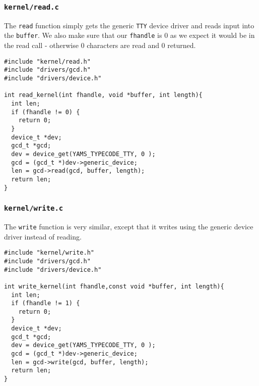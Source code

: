 \documentclass[a4paper,12pt]{article}
\begin{document}
\subsubsection{\texttt{kernel/read.c}}
The \texttt{read} function simply gets the generic \texttt{TTY} device driver and reads input into the \texttt{buffer}. We also make sure that our \texttt{fhandle} is 0 as we expect it would be in the read call - otherwise 0 characters are read and 0 returned.

\begin{lstlisting}
#include "kernel/read.h"
#include "drivers/gcd.h"
#include "drivers/device.h"

int read_kernel(int fhandle, void *buffer, int length){
  int len;
  if (fhandle != 0) {
    return 0;
  }
  device_t *dev;
  gcd_t *gcd;
  dev = device_get(YAMS_TYPECODE_TTY, 0 );
  gcd = (gcd_t *)dev->generic_device;
  len = gcd->read(gcd, buffer, length);
  return len;
}
\end{lstlisting}

\subsubsection{\texttt{kernel/write.c} }
The \texttt{write} function is very similar, except that it writes using the generic device driver instead of reading.

\begin{lstlisting}
#include "kernel/write.h"
#include "drivers/gcd.h"
#include "drivers/device.h"

int write_kernel(int fhandle,const void *buffer, int length){
  int len;
  if (fhandle != 1) {
    return 0;
  }
  device_t *dev;
  gcd_t *gcd;
  dev = device_get(YAMS_TYPECODE_TTY, 0 );
  gcd = (gcd_t *)dev->generic_device;
  len = gcd->write(gcd, buffer, length);
  return len;
}
\end{lstlisting}
\end{document}
